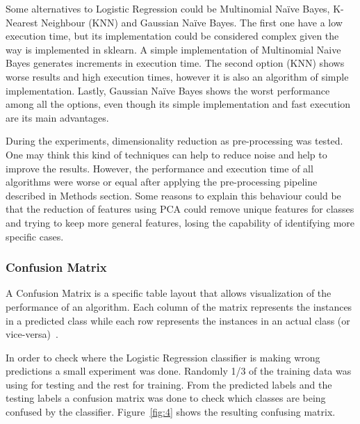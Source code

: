 \documentclass[letterpaper,10pt]{article}
\theoremstyle{mytheor}
\begin{document}
Some alternatives to Logistic Regression could be Multinomial Na\"{i}ve Bayes, K-Nearest Neighbour (KNN) and Gaussian Na\"{i}ve Bayes. The first one have a low execution time, but its implementation could be considered complex given the way is implemented in sklearn. A simple implementation of Multinomial Naive Bayes generates increments in execution time. The second option (KNN) shows worse results and high execution times, however it is also an algorithm of simple implementation. Lastly, Gaussian Na\"{i}ve Bayes shows the worst performance among all the options, even though its simple implementation and fast execution are its main advantages.

During the experiments, dimensionality reduction as pre-processing was tested. One may think this kind of techniques can help to reduce noise and help to improve the results. However, the performance and execution time of all algorithms were worse or equal after applying the pre-processing pipeline described in Methods section. Some reasons to explain this behaviour could be that the reduction of features using PCA could remove unique features for classes and trying to keep more general features, losing the capability of identifying more specific cases.    

\subsubsection{Confusion Matrix}

A Confusion Matrix is a specific table layout that allows visualization of the performance of an algorithm. Each column of the matrix represents the instances in a predicted class while each row represents the instances in an actual class (or vice-versa)~\cite{wiki:confusion}.

In order to check where the Logistic Regression classifier is making wrong predictions a small experiment was done. Randomly 1/3 of the training data was using for testing and the rest for training. From the predicted labels and the testing labels a confusion matrix was done to check which classes are being confused by the classifier. Figure~\ref{fig:4} shows the resulting confusing matrix.
\end{document}
